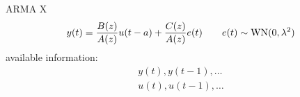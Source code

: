 
ARMA X
\[
	y(t)=\frac{B(z)}{A(z)} u(t-a)+\frac{C(z)}{A(z)}e(t)\qquad e(t)\sim \operatorname{WN}(0,\lambda^2 )
\]
available information:
\begin{gather*}
	y(t),y(t-1),\ldots \\
	u(t),u(t-1),\ldots
\end{gather*}
